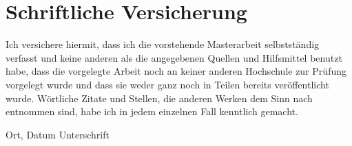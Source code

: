 \newpage
{}
\section*{Schriftliche Versicherung}

Ich versichere hiermit, dass ich die vorstehende Masterarbeit selbstst{\"a}ndig verfasst und keine anderen als die angegebenen Quellen und Hilfsmittel benutzt habe, dass die vorgelegte Arbeit noch an keiner anderen Hochschule zur Pr{\"u}fung vorgelegt wurde und dass sie weder ganz noch in Teilen bereits ver{\"o}ffentlicht  wurde. W{\"o}rtliche Zitate und Stellen, die anderen Werken dem Sinn nach entnommen sind, habe ich in jedem einzelnen Fall kenntlich gemacht.

\vspace{4cm}

\hspace{1cm} Ort, Datum \hfill Unterschrift \hspace{2cm}